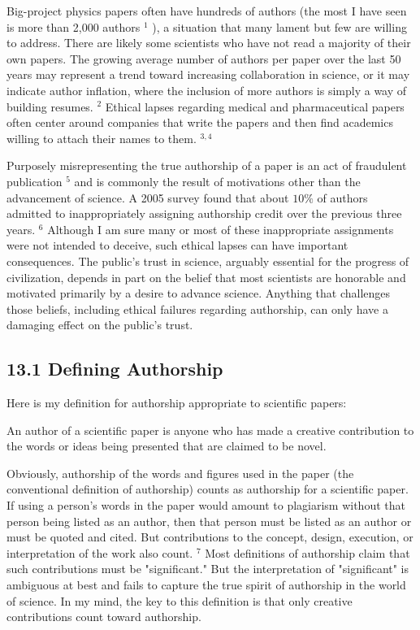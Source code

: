 Big-project physics papers often have hundreds of authors (the most I have seen is more than 2,000 authors ${ }^{1}$ ), a situation that many lament but few are willing to address. There are likely some scientists who have not read a majority of their own papers. The growing average number of authors per paper over the last 50 years may represent a trend toward increasing collaboration in science, or it may indicate author inflation, where the inclusion of more authors is simply a way of building resumes. ${ }^{2}$ Ethical lapses regarding medical and pharmaceutical papers often center around companies that write the papers and then find academics willing to attach their names to them. ${ }^{3,4}$

Purposely misrepresenting the true authorship of a paper is an act of fraudulent publication $^{5}$ and is commonly the result of motivations other than the advancement of science. A 2005 survey found that about $10 \%$ of authors admitted to inappropriately assigning authorship credit over the previous three years. ${ }^{6}$ Although I am sure many or most of these inappropriate assignments were not intended to deceive, such ethical lapses can have important consequences. The public's trust in science, arguably essential for the progress of civilization, depends in part on the belief that most scientists are honorable and motivated primarily by a desire to advance science. Anything that challenges those beliefs, including ethical failures regarding authorship, can only have a damaging effect on the public's trust.

\subsection*{13.1 Defining Authorship}
Here is my definition for authorship appropriate to scientific papers:

An author of a scientific paper is anyone who has made a creative contribution to the words or ideas being presented that are claimed to be novel.

Obviously, authorship of the words and figures used in the paper (the conventional definition of authorship) counts as authorship for a scientific paper. If using a person's words in the paper would amount to plagiarism without that person being listed as an author, then that person must be listed as an author or must be quoted and cited. But contributions to the concept, design, execution, or interpretation of the work also count. ${ }^{7}$ Most definitions of authorship claim that such contributions must be "significant." But the interpretation of "significant" is ambiguous at best and fails to capture the true spirit of authorship in the world of science. In my mind, the key to this definition is that only creative contributions count toward authorship.

